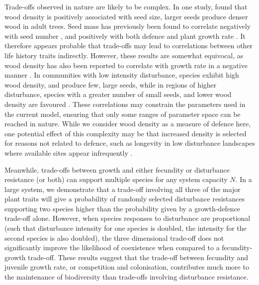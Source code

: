 Trade-offs observed in nature are likely to be complex. In one study, \cite{ter2001character} found that wood density is positively associated with seed size, larger seeds produce denser wood in adult trees. Seed mass has previously been found to correlate negatively with seed number \citep{turnbull1999seed}, and positively with both defence \citep{niklas1992plant} and plant growth rate \citep{gross1984effects}. It therefore appears probable that trade-offs may lead to correlations between other life history traits indirectly. However, these results are somewhat equivocal, as wood density has also been reported to correlate with growth rate in a negative manner \citep{king2005tree}. In communities with low intensity disturbance, species exhibit high wood density, and produce few, large seeds, while in regions of higher disturbance, species with a greater number of small seeds, and lower wood density are favoured \citep{ter2001character}. These correlations may constrain the parameters used in the current model, ensuring that only some ranges of parameter space can be reached in nature. While we consider wood density as a measure of defence here, one potential effect of this complexity may be that increased density is selected for reasons not related to defence, such as longevity in low disturbance landscapes where available sites appear infrequently \citep{laurance2004inferred}.

Meanwhile, trade-offs between growth and either fecundity or disturbance resistance (or both) can support multiple species for any system capacity $N$. In a large system, we demonstrate that a trade-off involving all three of the major plant traits will give a probability of randomly selected disturbance resistances supporting two species higher than the probability given by a growth-defence trade-off alone. However, when species responses to disturbance are proportional (such that disturbance intensity for one species is doubled, the intensity for the second species is also doubled), the three dimensional trade-off does not significantly improve the likelihood of coexistence when compared to a fecundity-growth trade-off. These results suggest that the trade-off between fecundity and juvenile growth rate, or competition and colonisation, contributes much more to the maintenance of biodiversity than trade-offs involving disturbance resistance.  

